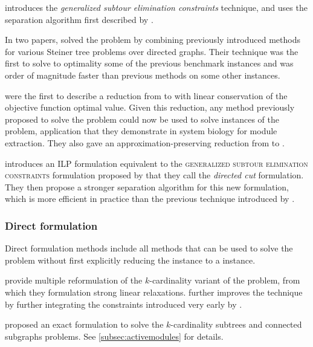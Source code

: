 		\Textcite{lucena2004strong} introduces the \emph{generalized subtour elimination constraints} technique, and uses the separation algorithm first described by \textcites{fischetti1994weighted}.

		In two papers, \textcites{ljubic2005solving}{ljubic2006algorithmic} solved the \mwcs{} problem by combining previously introduced methods for various Steiner tree problems over directed graphs. Their technique was the first to solve to optimality some of the previous benchmark instances and was order of magnitude faster than previous methods on some other instances.

		\Textcite{dittrich2008identifying} were the first to describe a reduction from \mwcs{} to \pcst{} with linear conservation of the objective function optimal value.
		Given this reduction, any method previously proposed to solve the \pcst{} problem could now be used to solve instances of the \mwcs{} problem, application that they demonstrate in system biology for module extraction.
		They also gave an approximation-preserving reduction from \pcst{} to \mwcs{}.
	
		\Textcite{chimani2009obtaining} introduces an ILP formulation equivalent to the \textsc{generalized subtour elimination constraints} formulation proposed by \textcite{lucena2004strong} that they call the \emph{directed cut} formulation.
		They then propose a stronger separation algorithm for this new formulation, which is more efficient in practice than the previous technique introduced by \textcites{fischetti1994weighted}.

	\subsubsection{Direct formulation}

	Direct formulation methods include all methods that can be used to solve the \mwcs{} problem without first explicitly reducing the \mwcs{} instance to a \pcst{} instance.

	\Textcite{quintao2008integer} provide multiple reformulation of the $k$-cardinality variant of the \mwcs{} problem, from which they formulation strong linear relaxations.
		\Textcite{quintao2010k} further improves the technique by further integrating the constraints introduced very early by \textcite{miller1960integer}.

		\Textcite{backes2012integer} proposed an exact formulation to solve the $k$-cardinality subtrees and connected subgraphs problems.
		See \cref{subsec:activemodules} for details.

